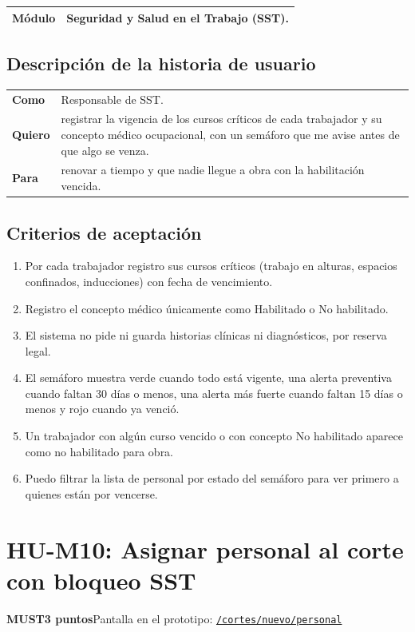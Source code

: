 \documentclass[11pt]{article}
\newcommand{\urlapp}{https://thankstochatgpt.github.io/LOARD}
\newcommand{\app}[1]{\href{\urlapp#1}{\texttt{#1}}}
\newcommand{\etiqueta}[1]{\colorbox{barra}{\textbf{\color{marca}#1}}}
\begin{document}
\begin{tabular}{>{\bfseries}p{2.4cm} p{13.4cm}}
\toprule
Módulo & Seguridad y Salud en el Trabajo (SST). \\
\bottomrule
\end{tabular}

\subsection*{Descripción de la historia de usuario}

\begin{tabular}{>{\bfseries}p{2.4cm} p{13.4cm}}
\toprule
Como & Responsable de SST. \\
Quiero & registrar la vigencia de los cursos críticos de cada trabajador y su concepto médico ocupacional, con un semáforo que me avise antes de que algo se venza. \\
Para & renovar a tiempo y que nadie llegue a obra con la habilitación vencida. \\
\bottomrule
\end{tabular}

\subsection*{Criterios de aceptación}

\begin{enumerate}
\item Por cada trabajador registro sus cursos críticos (trabajo en alturas, espacios confinados, inducciones) con fecha de vencimiento.
\item Registro el concepto médico únicamente como Habilitado o No habilitado.
\item El sistema no pide ni guarda historias clínicas ni diagnósticos, por reserva legal.
\item El semáforo muestra verde cuando todo está vigente, una alerta preventiva cuando faltan 30 días o menos, una alerta más fuerte cuando faltan 15 días o menos y rojo cuando ya venció.
\item Un trabajador con algún curso vencido o con concepto No habilitado aparece como no habilitado para obra.
\item Puedo filtrar la lista de personal por estado del semáforo para ver primero a quienes están por vencerse.
\end{enumerate}


\newpage
\section*{HU-M10: Asignar personal al corte con bloqueo SST}
\etiqueta{MUST}\quad\etiqueta{3 puntos}\quad Pantalla en el prototipo: \app{/cortes/nuevo/personal}
\end{document}
